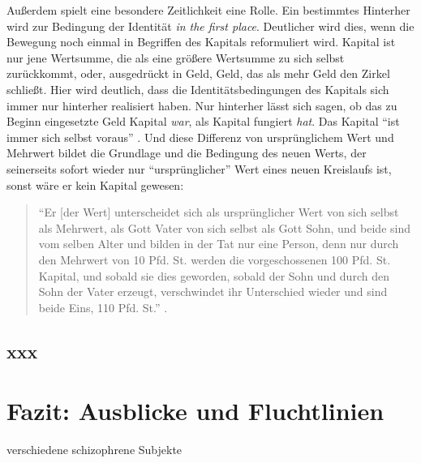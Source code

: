 \documentclass[12pt,
               DIV13,
               paper=a4,
               twoside=false,
               onehalfspacing,
               bibliography=totoc,
               toc=graduated,
               draft,
               ]{scrartcl}
\newcommand{\pc}[2]{\parencite[#1]{#2}}
\newcommand{\worries}[1]{\ifdraft{\textcolor{blue}{\texttt{(#1)}}}{}}
\begin{document}
Außerdem spielt eine besondere Zeitlichkeit eine Rolle. Ein bestimmtes
Hinterher wird zur Bedingung der Identität \emph{in the first place}.
Deutlicher wird dies, wenn die Bewegung noch einmal in Begriffen des
Kapitals reformuliert wird. Kapital ist nur jene Wertsumme, die als
eine größere Wertsumme zu sich selbst zurückkommt, oder, ausgedrückt
in Geld, Geld, das als mehr Geld den Zirkel schließt. \worries{Falte}
Hier wird deutlich, dass die Identitätsbedingungen des Kapitals sich
immer nur hinterher realisiert haben. Nur hinterher lässt sich sagen,
ob das zu Beginn eingesetzte Geld Kapital \emph{war}, als Kapital
fungiert \emph{hat}. Das Kapital "`ist immer sich selbst voraus"'
\pc{125}{strauss}. Und diese Differenz von ursprünglichem Wert und
Mehrwert bildet die Grundlage und die Bedingung des neuen Werts, der
seinerseits sofort wieder nur "`ursprünglicher"' Wert eines neuen
Kreislaufs ist, sonst wäre er kein Kapital gewesen:
%
\begin{spacing}{1}
\begin{quote}
"`Er [der Wert] unterscheidet sich als ursprünglicher
Wert von sich selbst als Mehrwert, als Gott Vater von sich selbst als
Gott Sohn, und beide sind vom selben Alter und bilden in der Tat nur
eine Person, denn nur durch den Mehrwert von 10 Pfd. St. werden die
vorgeschossenen 100 Pfd. St. Kapital, und sobald sie dies geworden,
sobald der Sohn und durch den Sohn der Vater erzeugt, verschwindet ihr
Unterschied wieder und sind beide Eins, 110 Pfd. St."' \pc{S. 169
f.}{kap}.
\end{quote}
\end{spacing}

\subsection{xxx}

\section{Fazit: Ausblicke und Fluchtlinien}

verschiedene schizophrene Subjekte

\newpage
\printshorthands
\printbibliography
\end{document}

